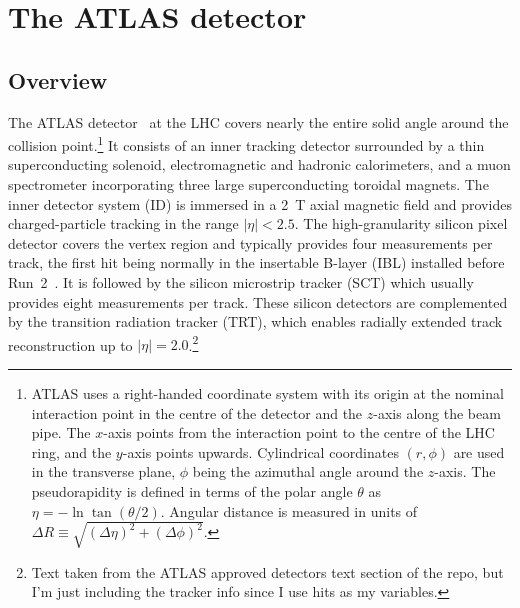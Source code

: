 \chapter{The  ATLAS detector}
\label{ch:atlas}

\def\figpath{figures/Undergrad thesis/}


\newcommand{\AtlasCoordFootnote}{ATLAS uses a right-handed coordinate system with its origin at the nominal interaction point
in the centre of the detector and the \(z\)-axis along the beam pipe.
The \(x\)-axis points from the interaction point to the centre of the LHC ring,
and the \(y\)-axis points upwards.
Cylindrical coordinates \((r,\phi)\) are used in the transverse plane, 
\(\phi\) being the azimuthal angle around the \(z\)-axis.
The pseudorapidity is defined in terms of the polar angle \(\theta\) as \(\eta = -\ln \tan(\theta/2)\).
Angular distance is measured in units of \(\Delta R \equiv \sqrt{(\Delta\eta)^{2} + (\Delta\phi)^{2}}\).}

\section{Overview}


The ATLAS detector~\cite{PERF-2007-01} at the LHC covers nearly the entire solid angle around the collision point.\footnote{\AtlasCoordFootnote}
It consists of an inner tracking detector surrounded by a thin superconducting solenoid, electromagnetic and hadronic calorimeters,
and a muon spectrometer incorporating three large superconducting toroidal magnets.
The inner detector system (ID) is immersed in a \SI{2}{\tesla} axial magnetic field 
and provides charged-particle tracking in the range \(|\eta| < 2.5\).
The high-granularity silicon pixel detector covers the vertex region and typically provides four measurements per track, 
the first hit being normally in the insertable B-layer (IBL) installed before Run~2~\cite{ATLAS-TDR-2010-19,PIX-2018-001}.
It is followed by the silicon microstrip tracker (SCT) which usually provides eight measurements per track.
These silicon detectors are complemented by the transition radiation tracker (TRT),
which enables radially extended track reconstruction up to \(|\eta| = 2.0\).\footnote{Text taken from the ATLAS approved detectors text section of the repo, but I'm just including the tracker info since I use hits as my variables.} 

